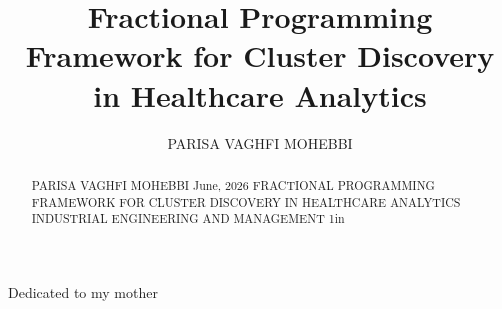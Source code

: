 \documentclass[12pt]{osuthesis}
\title{Fractional Programming Framework for Cluster Discovery in Healthcare Analytics}
\author{PARISA VAGHFI MOHEBBI}
\begin{document}
\maketitle

\makecopyright



\begin{dedication}
Dedicated to my mother
\end{dedication}

\begin{acknowledge}
 
\end{acknowledge}


\begin{abstract}{PARISA VAGHFI MOHEBBI}
{June, 2026}
{FRACTIONAL PROGRAMMING FRAMEWORK FOR CLUSTER DISCOVERY IN HEALTHCARE ANALYTICS}
{INDUSTRIAL ENGINEERING AND MANAGEMENT}
{1in}
   
\end{abstract}


\renewcommand{\listfigurename}{LIST OF FIGURES}
\renewcommand{\listtablename}{LIST OF TABLES}

{ %


\changepage{-29.43001pt}{}{}{}{}{}{15pt}{12pt}{}
\pagestyle{fancyplain}
\thispagestyle{plain}
\tableofcontents
}

\renewcommand{\cftfigaftersnum}{.}
\renewcommand{\cfttabaftersnum}{.}
\end{document}
